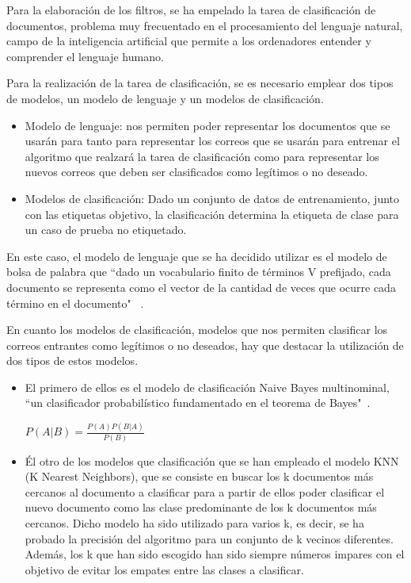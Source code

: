 \documentclass[conference,a4paper]{IEEEtran}
\begin{document}
Para la elaboración de los filtros, se ha empelado la tarea de clasificación de documentos, problema muy frecuentado en el procesamiento del lenguaje natural, campo de la inteligencia artificial que permite a los ordenadores entender y comprender el lenguaje humano.

Para la realización de la tarea de clasificación, se es necesario emplear dos tipos de modelos, un modelo de lenguaje y un modelos de clasificación.



\begin{itemize}
\item Modelo de lenguaje: nos permiten poder representar los documentos que se usarán para tanto para representar los correos que se usarán para entrenar el algoritmo que realzará la tarea de clasificación como para representar los nuevos correos que deben ser clasificados como legítimos o no deseado.
\item Modelos de clasificación: Dado un conjunto de datos de entrenamiento, junto con las etiquetas objetivo, la clasificación determina la etiqueta de clase para un caso de prueba no etiquetado.~\cite{b4}
\end{itemize}

En este caso, el modelo de lenguaje que se ha decidido utilizar es el modelo de bolsa de palabra que ``dado un vocabulario finito de términos V prefijado,
cada documento se representa como el vector de la cantidad de veces que ocurre cada término en el documento" ~\cite{b2}.

En cuanto los modelos de clasificación, modelos que nos permiten clasificar los correos entrantes como legítimos o no deseados, hay que destacar la utilización de dos tipos de estos modelos.

\begin{itemize}
\item El primero de ellos es el modelo de clasificación Naive Bayes multinominal, ``un clasificador probabilístico fundamentado en el teorema de Bayes"~\cite{b3}.
\newline

\begin{center}
$ P(A|B) =  \frac{P(A)P(B|A)}{P(B)} $\\
\end{center}

\item Él otro de los modelos que clasificación que se han empleado el modelo KNN (K Nearest Neighbors), que se consiste en buscar los k documentos más cercanos al documento a clasificar para a partir de ellos poder clasificar el nuevo documento como las clase predominante de los k documentos más cercanos. Dicho modelo ha sido utilizado para varios k, es decir, se ha probado la precisión del algoritmo para un conjunto de k vecinos diferentes. Además, los k que han sido escogido han sido siempre números impares con el objetivo de evitar los empates entre las clases a clasificar.
\end{itemize}
\end{document}
